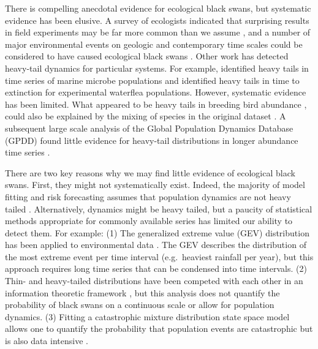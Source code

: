 There is compelling anecdotal evidence for ecological black swans, but
systematic evidence has been elusive. A survey of ecologists indicated that
surprising results in field experiments may be far more common than we assume
\citep{doak2008}, and a number of major environmental events on geologic and
contemporary time scales could be considered to have caused ecological black
swans \citep{nunez2012}. Other work has detected heavy-tail dynamics for
particular systems. For example, \citet{segura2013} identified heavy tails in
time series of marine microbe populations and \citet{drake2014} identified
heavy tails in time to extinction for experimental waterflea populations.
However, systematic evidence has been limited. What appeared to be heavy tails
in breeding bird abundance \citep{keitt1998}, could also be explained by the
mixing of species in the original dataset \citep{allen2001}. A subsequent
large scale analysis of the Global Population Dynamics Database (GPDD) found
little evidence for heavy-tail distributions in longer abundance time series
\citet{halley2002}.

There are two key reasons why we may find little evidence of ecological black
swans. First, they might not systematically exist. Indeed, the majority of
model fitting and risk forecasting assumes that population dynamics are not
heavy tailed \citep[e.g.][]{brook2006a,dennis2006,knape2012}. Alternatively,
dynamics might be heavy tailed, but a paucity of statistical methods
appropriate for commonly available series has limited our ability to detect
them. For example: (1) The generalized extreme value (GEV) distribution has
been applied to environmental data \citep[e.g.][]{katz2005}. The GEV describes
the distribution of the most extreme event per time interval (e.g.~heaviest
rainfall per year), but this approach requires long time series that can be
condensed into time intervals. (2) Thin- and heavy-tailed distributions have
been competed with each other in an information theoretic framework
\citep{halley2002}, but this analysis does not quantify the probability of
black swans on a continuous scale or allow for population dynamics. (3) Fitting
a catastrophic mixture distribution state space model allows one to quantify
the probability that population events are catastrophic but is also data
intensive \citep{ward2007}.


